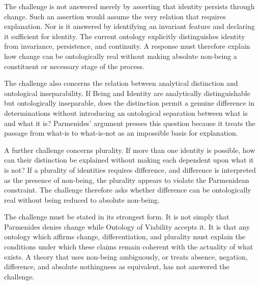 
The challenge is not answered merely by
asserting that identity persists through
change. Such an assertion would assume
the very relation that requires explanation.
Nor is it answered by identifying an
invariant feature and declaring it sufficient
for identity. The current ontology explicitly
distinguishes identity from invariance,
persistence, and continuity. A response
must therefore explain how change can
be ontologically real without making
absolute non-being a constituent or
necessary stage of the process.


The challenge also concerns the relation
between analytical distinction and ontological
inseparability. If Being and Identity are
analytically distinguishable but ontologically
inseparable, does the distinction permit
a genuine difference in determinations
without introducing an ontological separation
between what is and what it is? Parmenides'
argument presses this question because
it treats the passage from what-is to
what-is-not as an impossible basis for
explanation.


A further challenge concerns plurality.
If more than one identity is possible,
how can their distinction be explained
without making each dependent upon
what it is not? If a plurality of identities
requires difference, and difference is
interpreted as the presence of non-being,
the plurality appears to violate the
Parmenidean constraint. The challenge
therefore asks whether difference can
be ontologically real without being
reduced to absolute non-being.


The challenge must be stated in its strongest
form. It is not simply that Parmenides
denies change while Ontology of Viability
accepts it. It is that any ontology which
affirms change, differentiation, and
plurality must explain the conditions
under which these claims remain coherent
with the actuality of what exists. A
theory that uses non-being ambiguously,
or treats absence, negation, difference,
and absolute nothingness as equivalent,
has not answered the challenge.



